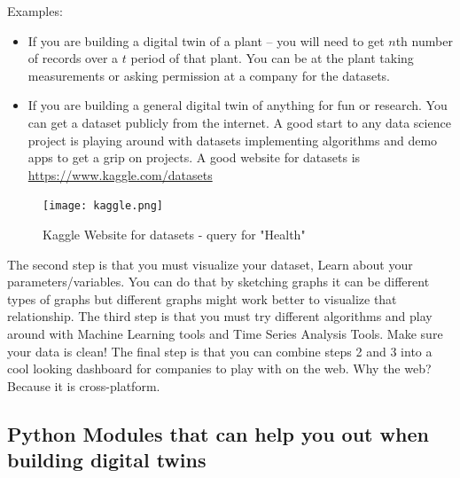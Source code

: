 Examples: \\

\begin{itemize}
\item    If you are building a digital twin of a plant – you will need to get $n$th number of records over a $t$ period of that plant. You can be at the plant taking measurements or asking permission at a company for the datasets.
\item	If you are building a general digital twin of anything for fun or research. You can get a dataset publicly from the internet. A good start to any data science project is playing around with datasets implementing algorithms and demo apps to get a grip on projects.
        A good website for datasets is \url{https://www.kaggle.com/datasets}
\end{itemize}    

\begin{figure}[H]
    \centering
    \texttt{[image: kaggle.png]}
    \caption{
        Kaggle Website for datasets - query for "Health"
        }
    \label{fig:dataset}
\end{figure}

The second step is that you must visualize your dataset, Learn about your parameters/variables. You can do that by sketching graphs it can be different types of graphs but different graphs might work better to visualize that relationship.
The third step is that you must try different algorithms and play around with Machine Learning tools and Time Series Analysis Tools. Make sure your data is clean! 
The final step is that you can combine steps 2 and 3 into a cool looking dashboard for companies to play with on the web. Why the web? Because it is cross-platform.

\subsection{Python Modules that can help you out when building digital twins}


